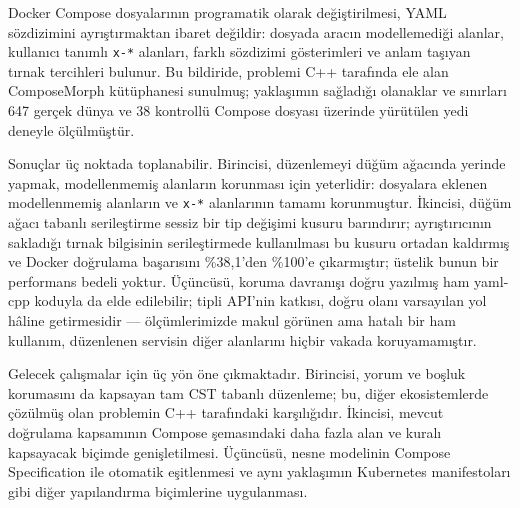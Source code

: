 \documentclass[12pt,a4paper]{article}
\begin{document}
Docker Compose dosyalarının programatik olarak değiştirilmesi, YAML
sözdizimini ayrıştırmaktan ibaret değildir: dosyada aracın modellemediği
alanlar, kullanıcı tanımlı \texttt{x-*} alanları, farklı sözdizimi gösterimleri ve anlam
taşıyan tırnak tercihleri bulunur. Bu bildiride, problemi C++ tarafında
ele alan ComposeMorph kütüphanesi sunulmuş; yaklaşımın sağladığı olanaklar
ve sınırları 647 gerçek dünya ve 38 kontrollü Compose dosyası üzerinde
yürütülen yedi deneyle ölçülmüştür.

Sonuçlar üç noktada toplanabilir. Birincisi, düzenlemeyi düğüm ağacında
yerinde yapmak, modellenmemiş alanların korunması için yeterlidir:
dosyalara eklenen modellenmemiş alanların ve \texttt{x-*} alanlarının
tamamı korunmuştur.
İkincisi, düğüm ağacı tabanlı serileştirme sessiz bir tip değişimi
kusuru barındırır; ayrıştırıcının sakladığı tırnak bilgisinin
serileştirmede kullanılması bu kusuru ortadan kaldırmış ve Docker
doğrulama başarısını \%38,1'den \%100'e çıkarmıştır; üstelik bunun bir
performans bedeli yoktur. Üçüncüsü, koruma davranışı doğru yazılmış ham
yaml-cpp koduyla da elde edilebilir; tipli API'nin katkısı, doğru olanı
varsayılan yol hâline getirmesidir --- ölçümlerimizde makul görünen ama
hatalı bir ham kullanım, düzenlenen servisin diğer alanlarını hiçbir
vakada koruyamamıştır.

Gelecek çalışmalar için üç yön öne çıkmaktadır. Birincisi, yorum ve boşluk
korumasını da kapsayan tam CST tabanlı düzenleme; bu, diğer ekosistemlerde
çözülmüş olan problemin C++ tarafındaki karşılığıdır. İkincisi, mevcut
doğrulama kapsamının Compose şemasındaki daha fazla alan ve kuralı
kapsayacak biçimde genişletilmesi. Üçüncüsü, nesne modelinin Compose
Specification ile otomatik eşitlenmesi ve aynı yaklaşımın Kubernetes
manifestoları gibi diğer yapılandırma biçimlerine uygulanması.
\end{document}
